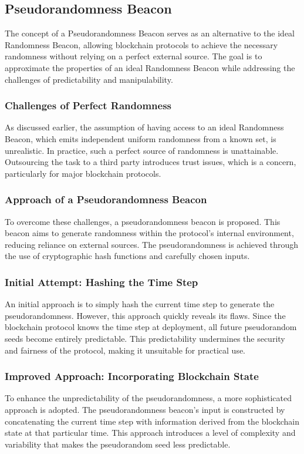 \subsection{Pseudorandomness Beacon}
The concept of a Pseudorandomness Beacon serves as an alternative to the ideal Randomness Beacon, allowing blockchain protocols to achieve the necessary randomness without relying on a perfect external source. The goal is to approximate the properties of an ideal Randomness Beacon while addressing the challenges of predictability and manipulability.

\subsubsection{Challenges of Perfect Randomness}
As discussed earlier, the assumption of having access to an ideal Randomness Beacon, which emits independent uniform randomness from a known set, is unrealistic. In practice, such a perfect source of randomness is unattainable. Outsourcing the task to a third party introduces trust issues, which is a concern, particularly for major blockchain protocols.

\subsubsection{Approach of a Pseudorandomness Beacon}
To overcome these challenges, a pseudorandomness beacon is proposed. This beacon aims to generate randomness within the protocol's internal environment, reducing reliance on external sources. The pseudorandomness is achieved through the use of cryptographic hash functions and carefully chosen inputs.

\subsubsection{Initial Attempt: Hashing the Time Step}
An initial approach is to simply hash the current time step to generate the pseudorandomness. However, this approach quickly reveals its flaws. Since the blockchain protocol knows the time step at deployment, all future pseudorandom seeds become entirely predictable. This predictability undermines the security and fairness of the protocol, making it unsuitable for practical use.

\subsubsection{Improved Approach: Incorporating Blockchain State}
To enhance the unpredictability of the pseudorandomness, a more sophisticated approach is adopted. The pseudorandomness beacon's input is constructed by concatenating the current time step with information derived from the blockchain state at that particular time. This approach introduces a level of complexity and variability that makes the pseudorandom seed less predictable.

